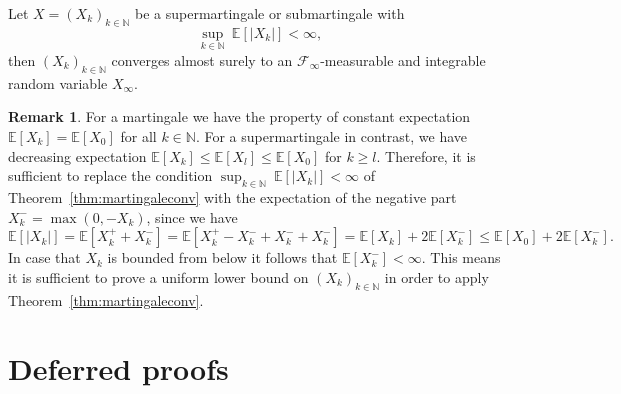 \documentclass[12pt,openany]{book}
\theoremstyle{definition}
\newtheorem{remark}[thm]{Remark}
\theoremstyle{definition}
\newcommand{\E}{\mathbb{E}}
\newcommand{\N}{\mathbb{N}}
\begin{document}
\begin{thm}\label{thm:martingaleconv}
Let $X=(X_k)_{k\in\N}$ be a supermartingale or submartingale with
\[\sup_{k\in\N}\ \E[|X_k|] <\infty, \]
then $(X_k)_{k\in\N}$ converges almost surely to an $\mathcal F_\infty$-measurable and integrable random variable $X_\infty$.
\end{thm}

\begin{remark}
For a martingale we have the property of constant expectation $\E[X_k]= \E[X_0]$ for all $k\in\N$. For a supermartingale in contrast, we have decreasing expectation $\E[X_k]\le \E[X_l]\le \E[X_0]$ for $k\ge l$. Therefore, it is sufficient to replace the condition $\sup_{k\in\N}\ \E[|X_k|] <\infty$ of Theorem~\ref{thm:martingaleconv} with the expectation of the negative part $X_k^{-} = \max(0,-X_k)$, since we have
\[\E[|X_k|] = \E[X_k^+ + X_k^-] = \E[X_k^+ - X_k^- + X_k^- + X_k^-] = \E[X_k] + 2\E[X_k^-] \le \E[X_0] + 2\E[X_k^-].\]
In case that $X_k$ is bounded from below it follows that $\E[X_k^-]<\infty$. This means it is sufficient to prove a uniform lower bound on $(X_k)_{k\in\N}$ in order to apply Theorem~\ref{thm:martingaleconv}.
\end{remark}

\section{Deferred proofs}\label{app:omittedproofs}
\end{document}
